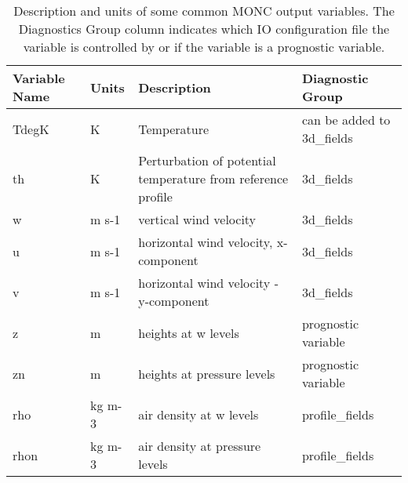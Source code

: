 \begin{table}[h]
	\centering
	\scriptsize
	\caption{Description and units of some common MONC output variables. The Diagnostics Group column indicates which IO configuration file the variable is controlled by or if the variable is a prognostic variable.}
	\label{tab:outputs}
	\begin{tabular}{|p{4cm}|p{1.2cm}|p{6cm}|p{3.2cm}|}
		\hline
		\textbf{Variable Name} & \textbf{Units} & \textbf{Description}                                                                            & \textbf{Diagnostic Group} \\ \hline
		TdegK                  & K              & Temperature                                                                                     & can be added to 3d\_fields \\ \hline
		th                     & K              & Perturbation of potential temperature from reference profile                                     & 3d\_fields                 \\ \hline
		w                      & m s-1          & vertical wind velocity                                                                          & 3d\_fields                 \\ \hline
		u                      & m s-1          & horizontal wind velocity, x-component                                                           & 3d\_fields                 \\ \hline
		v                      & m s-1          & horizontal wind velocity - y-component                                                          & 3d\_fields                 \\ \hline
		z                      & m              & heights at w levels                                                                             & prognostic variable      \\ \hline
		zn                     & m              & heights at pressure levels                                                                      & prognostic variable       \\ \hline
		rho                    & kg m-3         & air density at w levels                                                                         & profile\_fields       \\ \hline
		rhon                   & kg m-3         & air density at pressure levels                                                                  & profile\_fields       \\ \hline

\end{tabular}
\end{table}
